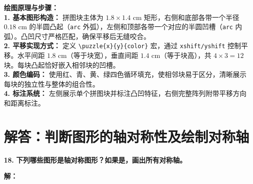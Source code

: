 \documentclass[12pt, a4paper]{ctexrep}
\begin{document}
\begin{center}
\end{center}

\vspace{0.4cm}
{\small\color{blue!70!black}
\textbf{绘图原理与步骤：}\\
\textbf{1. 基本图形构造：} 拼图块主体为 $1.8 \times 1.4$ cm 矩形，右侧和底部各带一个半径 $0.18$ cm 的半圆凸起（\texttt{arc} 外弧），左侧和顶部各带一个对应的半圆凹槽（\texttt{arc} 内弧）。凸凹尺寸严格匹配，确保平移后无缝咬合。\\
\textbf{2. 平移实现方式：} 定义 \texttt{\textbackslash{}puzzle\{x\}\{y\}\{color\}} 宏，通过 \texttt{xshift/yshift} 控制平移。水平间距 $1.8$ cm（等于块宽），垂直间距 $1.4$ cm（等于块高），共 $4 \times 3 = 12$ 块。每块凸起恰好嵌入相邻块的凹槽。\\
\textbf{3. 颜色编码：} 使用红、青、黄、绿四色循环填充，使相邻块易于区分，清晰展示每块的独立性与整体的组合性。\\
\textbf{4. 标注系统：} 左侧展示单个拼图块并标注凸凹特征，右侧完整阵列附带平移方向和距离标注。
}
\newpage

\section{解答：判断图形的轴对称性及绘制对称轴}

\vspace{0.6cm}

\textbf{\LARGE 18.} \textbf{下列哪些图形是轴对称图形？如果是，画出所有对称轴。}

\vspace{0.4cm}
\textbf{解：}
\end{document}
